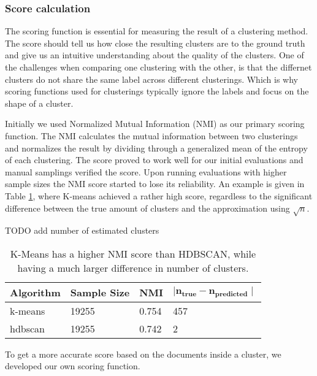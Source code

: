 
\subsubsection{Score calculation}

The scoring function is essential for measuring the result of a clustering method. The score should tell us how close the resulting clusters are to the ground truth and give us an intuitive understanding about the quality of the clusters. One of the challenges when comparing one clustering with the other, is that the differnet clusters do not share the same label across different clusterings. Which is why scoring functions used for clusterings typically ignore the labels and focus on the shape of a cluster.

Initially we used Normalized Mutual Information (NMI) as our primary scoring function. The NMI calculates the mutual information between two clusterings and normalizes the result by dividing through a generalized mean of the entropy of each clustering. %
The score proved to work well for our initial evaluations and manual samplings verified the score. Upon running evaluations with higher sample sizes the NMI score started to lose its reliability. An example is given in Table \ref{tab:nmi_kmeans_example}, where K-means achieved a rather high score, regardless to the significant difference between the true amount of clusters and the approximation using $\sqrt{n}$.


TODO add number of estimated clusters
\begin{table}[h]
    \centering
    \begin{tabular}{|l|l|l|l|}
    \hline
    \textbf{Algorithm} & \textbf{Sample Size} & \textbf{NMI}  & $\mathbf{ \mid n_{true} - n_{predicted} \mid }$ \\ \hline
    k-means & 19255 & 0.754 & 457 \\ \hline
    hdbscan & 19255 & 0.742 & 2 \\ \hline
    \end{tabular}
    \caption{K-Means has a higher NMI score than HDBSCAN, while having a much larger difference in number of clusters.}
    \label{tab:nmi_kmeans_example}
\end{table}

To get a more accurate score based on the documents inside a cluster, we developed our own scoring function. 

